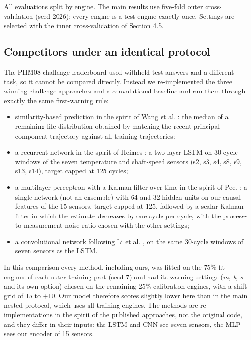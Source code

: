 \documentclass[a4paper,fleqn,doubleblind]{cas-dc}
\begin{document}
All evaluations split by engine. The main results use five-fold outer cross-validation (seed 2026); every engine is a test engine exactly once. Settings are selected with the inner cross-validation of Section 4.5.

\subsection{Competitors under an identical protocol}

The PHM08 challenge leaderboard used withheld test answers and a different task, so it cannot be compared directly. Instead we re-implemented the three winning challenge approaches and a convolutional baseline and ran them through exactly the same first-warning rule:

\begin{itemize}[leftmargin=1.2em,itemsep=2pt]
\item similarity-based prediction in the spirit of Wang et al. \cite{wang2008}: the median of a remaining-life distribution obtained by matching the recent principal-component trajectory against all training trajectories;
\item a recurrent network in the spirit of Heimes \cite{heimes2008}: a two-layer LSTM \cite{zheng2017} on 30-cycle windows of the seven temperature and shaft-speed sensors (s2, s3, s4, s8, s9, s13, s14), target capped at 125 cycles;
\item a multilayer perceptron with a Kalman filter over time in the spirit of Peel \cite{peel2008}: a single network (not an ensemble) with 64 and 32 hidden units on our causal features of the 15 sensors, target capped at 125, followed by a scalar Kalman filter in which the estimate decreases by one cycle per cycle, with the process-to-measurement noise ratio chosen with the other settings;
\item a convolutional network following Li et al. \cite{li2018}, on the same 30-cycle windows of seven sensors as the LSTM.
\end{itemize}

In this comparison every method, including ours, was fitted on the 75\% fit engines of each outer training part (seed 7) and had its warning settings (\textit{m}, \textit{k}, \textit{s} and its own option) chosen on the remaining 25\% calibration engines, with a shift grid of \textminus{}15 to +10. Our model therefore scores slightly lower here than in the main nested protocol, which uses all training engines. The methods are re-implementations in the spirit of the published approaches, not the original code, and they differ in their inputs: the LSTM and CNN see seven sensors, the MLP sees our encoder of 15 sensors.
\end{document}
